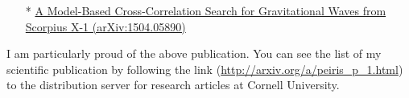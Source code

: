 \documentclass[11pt]{article}
\begin{document}
\begin{itemize}

\item [*] \href{http://arxiv.org/abs/1504.05890} {A Model-Based Cross-Correlation Search for Gravitational Waves from Scorpius X-1 (arXiv:1504.05890)}









\end{itemize}

I am particularly proud of the above publication. You can see the list of my scientific publication by following the link (\href{http://arxiv.org/a/peiris_p_1.html}{http://arxiv.org/a/peiris\_p\_1.html})  to the distribution server for research articles at Cornell University.
\end{document}
